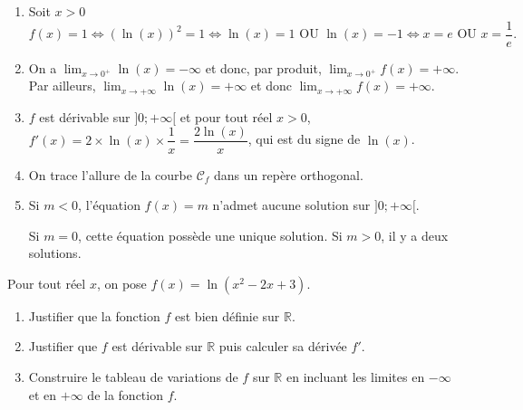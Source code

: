 \documentclass[11pt,fleqn, openany]{book} %
\begin{document}
\begin{solution}\hspace{0pt}
\begin{enumerate}
\item Soit $x>0$
\[ f(x)=1 \Leftrightarrow (\ln(x))^2 = 1 \Leftrightarrow \ln(x)=1 \text{ OU } \ln(x)=-1 \Leftrightarrow x=e \text{ OU } x = \dfrac{1}{e}.\]
\item On a $\displaystyle\lim_{x\to 0^+}\ln(x)=-\infty$ et donc, par produit, $\displaystyle\lim_{x\to 0^+}f(x)=+\infty$. Par ailleurs, $\displaystyle\lim_{x\to +\infty}\ln(x)=+\infty$ et donc $\displaystyle\lim_{x\to +\infty}f(x)=+\infty$.
\item $f$ est dérivable sur $]0;+\infty[$ et pour tout réel $x>0$, $f'(x)= 2 \times \ln(x) \times \dfrac{1}{x} = \dfrac{2\ln(x)}{x}$, qui est du signe de $\ln(x)$.
\begin{center}
\end{center}
\item On trace l'allure de la courbe $\mathcal{C}_f$ dans un repère orthogonal.

\begin{center}
\end{center}

\item Si $m < 0$, l'équation $f(x)=m$ n'admet aucune solution sur $]0;+\infty[$.

Si $m=0$, cette équation possède une unique solution. Si $m>0$, il y a deux solutions.

\end{enumerate}
\end{solution}




\begin{exercise}[topic=log03]
Pour tout réel $x$, on pose $f(x)=\ln(x^2-2x+3)$.
\begin{enumerate}
\item Justifier que la fonction $f$ est bien définie sur $\mathbb{R}$.
\item Justifier que $f$ est dérivable sur $\mathbb{R}$ puis calculer sa dérivée $f'$.
\item Construire le tableau de variations de $f$ sur $\mathbb{R}$ en incluant les limites en $-\infty$ et en $+\infty$ de la fonction $f$.
\end{enumerate}
\end{exercise}
\end{document}

